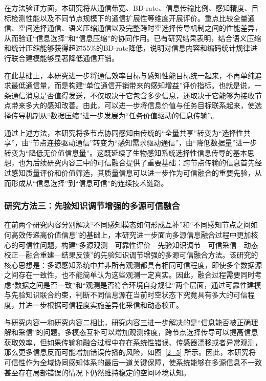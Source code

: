 在方法验证方面，本研究将从通信带宽、BD-rate、信息传输比例、感知精度、目标检测性能以及不同节点规模下的通信扩展性等维度开展评价。重点比较全量通信、空间选择通信、语义压缩通信以及完整跨时空选择传导机制之间的性能差异，从而验证“信息选择”和“信息压缩”的协同作用。已有研究结果表明，结合语义压缩和统计压缩能够获得超过55\%的BD-rate降低，说明对信息内容和编码统计规律进行联合建模能够显著降低通信开销。

在此基础上，本研究进一步将通信效率目标与感知性能目标统一起来，不再单纯追求最低通信量，而是构建“单位通信开销带来的感知增益”评价指标。也就是说，一条通信消息是否值得发送，不仅取决于它包含多少信息，还取决于它能够为接收节点带来多大的感知改善。由此，可以进一步将信息价值与任务目标联系起来，使选择传导机制从“数据压缩”进一步发展为“任务价值驱动的信息传输”。

通过上述方法，本研究将多节点协同感知由传统的“全量共享”转变为“选择性共享”，由“节点连接驱动通信”转变为“感知需求驱动通信”，由“降低数据量”进一步转变为“降低无价值信息量”。这既延续了生物感知系统选择性信息传导的基本思想，也为后续研究内容三中的可信融合提供了重要基础：跨节点传输的信息首先经过感知质量评价和价值筛选，其质量信息可以进一步作为可信融合的重要先验，从而形成从“信息选择”到“信息可信”的连续技术链路。

\subsubsection{研究方法三：先验知识调节增强的多源可信融合}

在前两个研究内容分别解决“不同感知模态如何形成互补”和“不同感知节点之间如何高效传递高价值信息”的基础上，本研究进一步面向多源信息融合过程中更加核心的可信性问题，构建“多源观测—可靠性评价—先验知识调节—可信采信—动态校正—融合重建—结果反馈”的先验知识调节增强的多源可信融合方法。该研究的核心思想是：多源感知系统中并非所有观测都具有相同可信程度，即使多个数据源之间存在一致性，也不能简单认为这些观测一定真实。因此，融合过程需要同时考虑“数据之间是否一致”和“观测是否符合环境自身规律”两个层面，通过可靠性建模与先验知识联合约束，判断不同信息源在当前时空状态下究竟具有多大的可信程度，并进一步根据可信程度实施差异化采信和动态校正。

与研究内容一和研究内容二相比，研究内容三进一步解决的是“信息能否被正确理解和采信”的问题。多模态互补可以增加观测维度，跨节点选择传导可以提高信息获取效率，但如果传输和融合过程中存在系统性错误、传感器漂移或者异常观测，那么更多信息反而可能增加错误传播的风险，如图~\ref{2_5} 所示。因此，本研究将可信性作为全域协同感知体系的最后一道关键保障，使系统能够在多源信息不一致甚至存在局部错误的情况下仍然维持稳定的空间环境认知。


